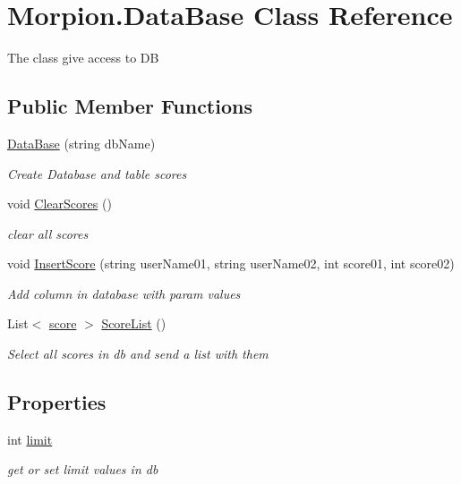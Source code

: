 \hypertarget{class_morpion_1_1_data_base}{}\section{Morpion.\+Data\+Base Class Reference}
\label{class_morpion_1_1_data_base}


The class give access to DB  


\subsection*{Public Member Functions}
\begin{DoxyCompactItemize}
\item 
\hyperlink{class_morpion_1_1_data_base_a0d69b39dbf424f7d4105df7a3ec0a586}{Data\+Base} (string db\+Name)
\begin{DoxyCompactList}\small\item\em Create Database and table scores \end{DoxyCompactList}\item 
void \hyperlink{class_morpion_1_1_data_base_a08b6bf1e688f66fbde3e818e08503be6}{Clear\+Scores} ()
\begin{DoxyCompactList}\small\item\em clear all scores \end{DoxyCompactList}\item 
void \hyperlink{class_morpion_1_1_data_base_ac964919b18e41d29326dd96ff9694d5a}{Insert\+Score} (string user\+Name01, string user\+Name02, int score01, int score02)
\begin{DoxyCompactList}\small\item\em Add column in database with param values \end{DoxyCompactList}\item 
List$<$ \hyperlink{class_morpion_1_1score}{score} $>$ \hyperlink{class_morpion_1_1_data_base_a2a5074579eb5d2bb7c67cf2a8ec6e6ec}{Score\+List} ()
\begin{DoxyCompactList}\small\item\em Select all scores in db and send a list with them \end{DoxyCompactList}\end{DoxyCompactItemize}
\subsection*{Properties}
\begin{DoxyCompactItemize}
\item 
int \hyperlink{class_morpion_1_1_data_base_ac0104fe497ec69fc184498e3e904b41f}{limit}
\begin{DoxyCompactList}\small\item\em get or set limit values in db \end{DoxyCompactList}\end{DoxyCompactItemize}


